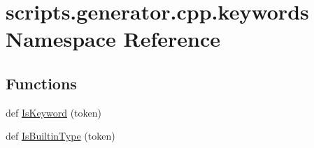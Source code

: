 \hypertarget{namespacescripts_1_1generator_1_1cpp_1_1keywords}{}\section{scripts.\+generator.\+cpp.\+keywords Namespace Reference}
\label{namespacescripts_1_1generator_1_1cpp_1_1keywords}
\subsection*{Functions}
\begin{DoxyCompactItemize}
\item 
def \mbox{\hyperlink{namespacescripts_1_1generator_1_1cpp_1_1keywords_a7f43ad31fd6c84215cb8f90e66fb22f8}{Is\+Keyword}} (token)
\item 
def \mbox{\hyperlink{namespacescripts_1_1generator_1_1cpp_1_1keywords_a59b8831daced8b5b7d9d3b708c940421}{Is\+Builtin\+Type}} (token)
\end{DoxyCompactItemize}
